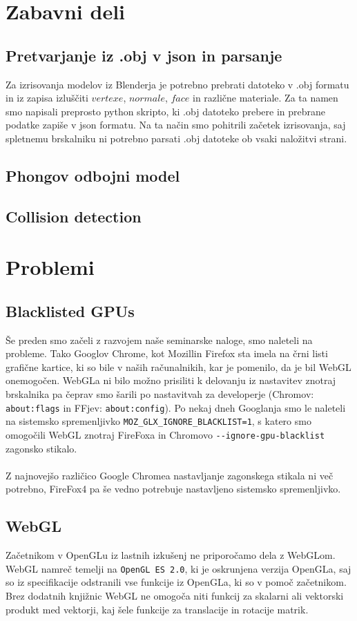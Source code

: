 \documentclass[10pt,a4paper]{article}
\begin{document}
\section{Zabavni deli}
\subsection{Pretvarjanje iz .obj v json in parsanje}
Za izrisovanja modelov iz Blenderja je potrebno prebrati datoteko v .obj formatu in iz zapisa
izluščiti $vertexe$, $normale$, $face$ in različne materiale. Za ta namen smo 
napisali preprosto python skripto, ki .obj datoteko prebere in prebrane podatke 
zapiše v json formatu. Na ta način smo pohitrili začetek izrisovanja, saj spletnemu
brskalniku ni potrebno parsati .obj datoteke ob vsaki naložitvi strani.
\subsection{Phongov odbojni model}
\subsection{Collision detection}
\pagebreak
\section{Problemi}
\subsection{Blacklisted GPUs}
Še preden smo začeli z razvojem naše seminarske naloge, smo naleteli na probleme.
Tako Googlov Chrome, kot Mozillin Firefox sta imela na črni listi grafične kartice,
ki so bile v naših računalnikih, kar je pomenilo, da je bil WebGL onemogočen. 
WebGLa ni bilo možno prisiliti k delovanju iz nastavitev znotraj brskalnika pa 
čeprav smo šarili po nastavitvah za developerje (Chromov: \verb|about:flags| in FFjev: \verb|about:config|).
Po nekaj dneh Googlanja smo le naleteli na sistemsko spremenljivko \verb|MOZ_GLX_IGNORE_BLACKLIST=1|,
s katero smo omogočili WebGL znotraj FireFoxa in Chromovo \verb|--ignore-gpu-blacklist| zagonsko stikalo.\\\\
Z najnovejšo različico Google Chromea nastavljanje zagonskega stikala ni več potrebno, 
FireFox4 pa še vedno potrebuje nastavljeno sistemsko spremenljivko.
\subsection{WebGL}
Začetnikom v OpenGLu iz lastnih izkušenj ne priporočamo dela z WebGLom. WebGL namreč temelji
na \verb|OpenGL ES 2.0|, ki je oskrunjena verzija OpenGLa, saj so iz specifikacije odstranili
vse funkcije iz OpenGLa, ki so v pomoč začetnikom. Brez dodatnih knjižnic WebGL ne
omogoča niti funkcij za skalarni ali vektorski produkt med vektorji, kaj šele funkcije
za translacije in rotacije matrik.
\end{document}
